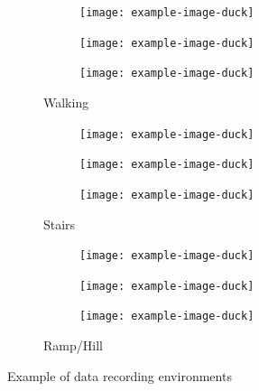 \begin{figure}[!hbt]
     \centering
     \begin{subfigure}[b]{\textwidth}
         \centering
         \begin{subfigure}[b]{0.32\textwidth}
             \centering
             \texttt{[image: example-image-duck]}
        \end{subfigure}
        \hfill
         \begin{subfigure}[b]{0.32\textwidth}
             \centering
             \texttt{[image: example-image-duck]}
        \end{subfigure}
        \hfill
        \begin{subfigure}[b]{0.32\textwidth}
             \centering
             \texttt{[image: example-image-duck]}
        \end{subfigure}
        \caption{Walking}
        \label{fig:methods-flat-example}
      \end{subfigure}
      \newline
      
      \begin{subfigure}[b]{\textwidth}
         \centering
         \begin{subfigure}[b]{0.32\textwidth}
             \centering
             \texttt{[image: example-image-duck]}
        \end{subfigure}
        \hfill
         \begin{subfigure}[b]{0.32\textwidth}
             \centering
             \texttt{[image: example-image-duck]}
        \end{subfigure}
        \hfill
        \begin{subfigure}[b]{0.32\textwidth}
             \centering
             \texttt{[image: example-image-duck]}
        \end{subfigure}
        \caption{Stairs}
        \label{fig:methods-stair-example}
      \end{subfigure}
      \newline
      
      \begin{subfigure}[b]{\textwidth}
         \centering
         \begin{subfigure}[b]{0.32\textwidth}
             \centering
             \texttt{[image: example-image-duck]}
        \end{subfigure}
        \hfill
         \begin{subfigure}[b]{0.32\textwidth}
             \centering
             \texttt{[image: example-image-duck]}
        \end{subfigure}
        \hfill
        \begin{subfigure}[b]{0.32\textwidth}
             \centering
             \texttt{[image: example-image-duck]}
        \end{subfigure}
        \caption{Ramp/Hill}
        \label{fig:methods-ramp-example}
      \end{subfigure}
    \caption{Example of data recording environments}
    \label{fig:three graphs}
\end{figure}


